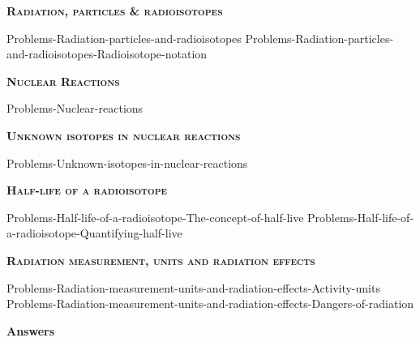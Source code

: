\documentclass[main.tex]{subfiles}
\newcommand\chapterlabel{Ch-nuclear}
\begin{document}
\newpage
 
\fancyhfoffset[E,O]{0pt}
\setlength{\columnsep}{30pt}
\begin{conclusion}
\end{conclusion}
\begin{multicols*}{2}\setcounter{numA}{1}







{\raggedright\textsc{\textbf{Radiation, particles \& radioisotopes }}\par}

{Problems-Radiation-particles-and-radioisotopes}
{Problems-Radiation-particles-and-radioisotopes-Radioisotope-notation}







{\raggedright\textsc{\textbf{Nuclear Reactions }}\par}

{Problems-Nuclear-reactions}

  

 {\raggedright\textsc{\textbf{Unknown isotopes in nuclear reactions }}\par}



{Problems-Unknown-isotopes-in-nuclear-reactions}





{\raggedright\textsc{\textbf{Half-life of a radioisotope }}\par}
{Problems-Half-life-of-a-radioisotope-The-concept-of-half-live}
{Problems-Half-life-of-a-radioisotope-Quantifying-half-live}

 
{\raggedright\textsc{\textbf{ Radiation measurement, units and radiation effects }}\par}

{Problems-Radiation-measurement-units-and-radiation-effects-Activity-units}
{Problems-Radiation-measurement-units-and-radiation-effects-Dangers-of-radiation}






 \end{multicols*}
\newpage
\begin{answersenvironment}
\begin{minipage}[c]{1\textwidth}
\begin{localsize}{10}
{\Large \bf Answers}
 \printsolutions[byID={1,3,5,7,9,11,13,15}]
\end{localsize}
\end{minipage}\end{answersenvironment}
\end{document}
